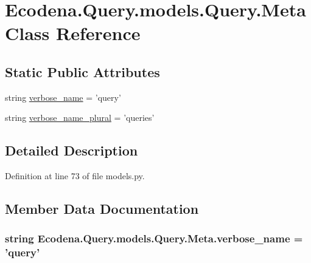 \hypertarget{class_ecodena_1_1_query_1_1models_1_1_query_1_1_meta}{
\section{Ecodena.Query.models.Query.Meta Class Reference}
\label{d2/d09/class_ecodena_1_1_query_1_1models_1_1_query_1_1_meta}
}
\subsection*{Static Public Attributes}
\begin{DoxyCompactItemize}
\item 
string \hyperlink{class_ecodena_1_1_query_1_1models_1_1_query_1_1_meta_aa23af14d7fe26b0599114e73201de85c}{verbose\_\-name} = 'query'
\item 
string \hyperlink{class_ecodena_1_1_query_1_1models_1_1_query_1_1_meta_ac57db1e879cded42a3f4d35c04c56be8}{verbose\_\-name\_\-plural} = 'queries'
\end{DoxyCompactItemize}


\subsection{Detailed Description}


Definition at line 73 of file models.py.



\subsection{Member Data Documentation}
\hypertarget{class_ecodena_1_1_query_1_1models_1_1_query_1_1_meta_aa23af14d7fe26b0599114e73201de85c}{
\subsubsection[{verbose\_\-name}]{\setlength{\rightskip}{0pt plus 5cm}string {\bf Ecodena.Query.models.Query.Meta.verbose\_\-name} = 'query'}}
\label{d2/d09/class_ecodena_1_1_query_1_1models_1_1_query_1_1_meta_aa23af14d7fe26b0599114e73201de85c}


